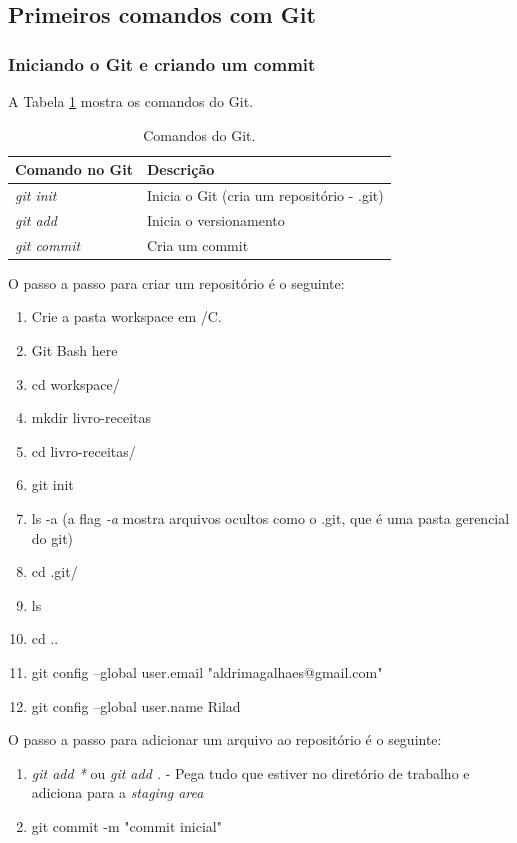 \documentclass[12pt,a4paper]{article}
\begin{document}
	\subsection{Primeiros comandos com Git}
	
	\subsubsection{Iniciando o Git e criando um commit}
	
	A Tabela \ref{tab:ComandosGit} mostra os comandos do Git.
	
	\begin{table}[!htpb]
		\centering
		\begin{tabular}{|p{}|p{}|}%
			\hline
			Comando no Git & Descrição \\
			\hline
			\textit{git init} & Inicia o Git (cria um repositório - .git) \\
			\hline
			\textit{git add} & Inicia o versionamento \\
			\hline
			\textit{git commit} & Cria um commit \\
			\hline
		\end{tabular}
		\caption{Comandos do Git.}
		\label{tab:ComandosGit}
	\end{table}
	
	O passo a passo para criar um repositório é o seguinte:
	\begin{enumerate}
		\item Crie a pasta workspace em /C.
		\item Git Bash here
		\item cd workspace/
		\item mkdir livro-receitas
		\item cd livro-receitas/
		\item git init
		\item ls -a (a flag \textit{-a} mostra arquivos ocultos como o .git, que é uma pasta gerencial do git)
		\item cd .git/
		\item ls
		\item cd ..
		\item git config --global user.email "aldrimagalhaes@gmail.com"
		\item git config --global user.name Rilad
	\end{enumerate}

	O passo a passo para adicionar um arquivo ao repositório é o seguinte:
	\begin{enumerate}
		\item \textit{git add *} ou \textit{git add .} - Pega tudo que estiver no diretório de trabalho e adiciona para a \textit{staging area}
		\item git commit -m "commit inicial"
	\end{enumerate}
\end{document}
